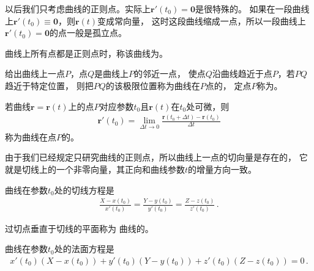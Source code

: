 以后我们只考虑曲线的正则点。实际上$\bm r'(t_0)=\bm 0$是很特殊的。
如果在一段曲线上$\bm r'(t_0)\equiv\bm 0$，则$\bm r(t)$变成常向量，
这时这段曲线缩成一点，所以一段曲线上$\bm r'(t_0)=\bm 0$的点一般是孤立点。
\begin{definition}
    曲线上所有点都是正则点时，称该曲线为。
\end{definition}

\begin{definition}
    给出曲线上一点$P$，点$Q$是曲线上$P$的邻近一点，
    使点$Q$沿曲线趋近于点$P$，若$PQ$趋近于特定位置，
    则把$PQ$的该极限位置称为曲线在$P$点的，
    定点$P$称为。
\end{definition}

\begin{definition}
    若曲线$\bm r=\bm r(t)$上的点$P$对应参数$t_0$且$\bm r(t)$在$t_0$处可微，则
    \begin{align}\label{eq:03ex01.5}
        \bm r'(t_0)=\lim\limits_{\Delta t\rightarrow0}{\frac{\bm r(t_0+\Delta t)-\bm r(t_0)}{\Delta t}}
    \end{align}
    称为曲线在点$P$的。
\end{definition}

由于我们已经规定只研究曲线的正则点，所以曲线上一点的切向量是存在的，
它就是切线上的一个非零向量，其正向和曲线参数$t$的增量方向一致。

\begin{corollary}
    曲线在参数$t_0$处的切线方程是
    \begin{align}\label{eq:03ex01.6}
        \frac{X-x(t_0)}{x'(t_0)}=\frac{Y-y(t_0)}{y'(t_0)}=\frac{Z-z(t_0)}{z'(t_0)}\, .
    \end{align}
\end{corollary}

\begin{definition}
    过切点垂直于切线的平面称为
    曲线的。
\end{definition}

\begin{corollary}
    曲线在参数$t_0$处的法面方程是
    \begin{align}\label{eq:03ex01.7}
        x'(t_0)(X-x(t_0))+y'(t_0)(Y-y(t_0))+z'(t_0)(Z-z(t_0))=0\, .
    \end{align}
\end{corollary}

